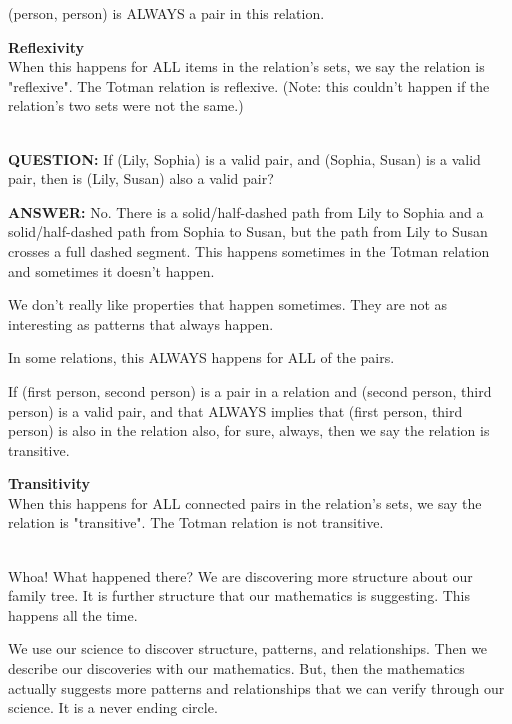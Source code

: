 \documentclass{ximera}
\begin{document}
(person, person) is ALWAYS a pair in this relation.


\begin{definition} 
\textbf{Reflexivity} \\
When this happens for ALL items in the relation's sets, we say the relation is "reflexive".  The Totman relation is reflexive. (Note: this couldn't happen if the relation's two sets were not the same.)
\end{definition}
\quad \\

\textbf{QUESTION:} If (Lily, Sophia) is a valid pair, and (Sophia, Susan) is a valid pair, then is (Lily, Susan) also a valid pair?

\textbf{ANSWER:} No. There is a solid/half-dashed path from Lily to Sophia and a solid/half-dashed path from Sophia to Susan, but the path from Lily to Susan crosses a full dashed segment. This happens sometimes in the Totman relation and sometimes it doesn't happen.
 
 
 
 
We don't really like properties that happen sometimes. They are not as interesting as patterns that always happen.

In some relations, this ALWAYS happens for ALL of the pairs.  

If (first person, second person) is a pair in a relation and (second person, third person) is a valid pair, and that ALWAYS implies that (first person, third person) is also in the relation also, for sure, always, then we say the relation is transitive.

\begin{definition} 
\textbf{Transitivity} \\
When this happens for ALL connected pairs in the relation's sets, we say the relation is "transitive".  The Totman relation is not transitive.
\end{definition}
\quad \\

Whoa!  What happened there?  We are discovering more structure about our family tree.  It is further structure that our mathematics is suggesting.  This happens all the time.  

We use our science to discover structure, patterns, and relationships.  Then we describe our discoveries with our mathematics.  But, then the mathematics actually suggests more patterns and relationships that we can verify through our science. It is a never ending circle.
\end{document}
